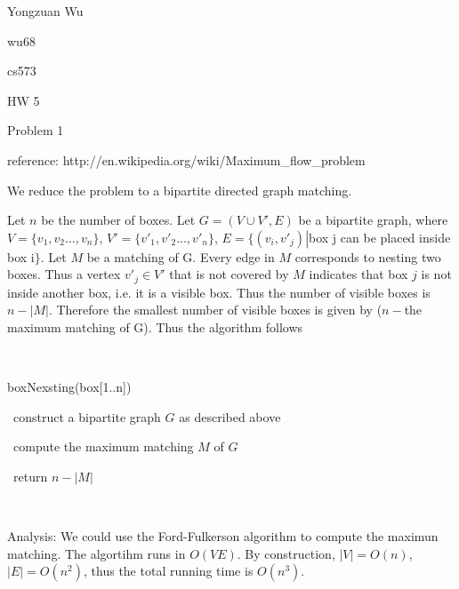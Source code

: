 \documentclass[a4paper,12pt]{article}
\begin{document}
Yongzuan Wu

wu68

cs573

HW 5

Problem 1

reference: http://en.wikipedia.org/wiki/Maximum_flow_problem

We reduce the problem to a bipartite directed graph matching.

Let $n$ be the number of boxes. Let $G=(V\cup V',E)$ be a bipartite graph, where $V=\{v_{1}, v_{2}...,v_{n}\}$, $V'=\{v'_{1}, v'_{2}...,v'_{n}\}$,  $E=\{(v_{i},v'_{j})\left| $box j can be placed inside box i$\}$. Let $M$ be a matching of G. Every edge in $M$ corresponds to nesting two boxes. Thus a vertex $v'_{j} \in V'$ that is not covered by $M$ indicates that box $j$ is not inside another box, i.e. it is a visible box. Thus the number of visible boxes is $n-\left|M\right|$. Therefore the smallest number of visible boxes is given by ($n-$the maximum matching of G). Thus the algorithm follows

\

boxNexsting(box[1..n])

\ construct a bipartite graph $G$ as described above

\ compute the maximum matching $M$ of $G$

\ return $n-\left|M\right|$

\

Analysis:
We could use the Ford-Fulkerson algorithm to compute the maximun matching. The algortihm runs in $O(VE)$. By construction, $\left|V\right|=O(n)$, $\left|E\right|=O(n^{2})$, thus the total running time is $O(n^{3})$.
\end{document}
